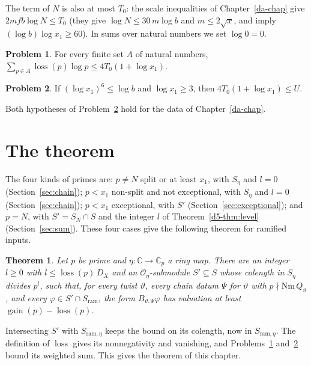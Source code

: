 \documentclass[reqno]{amsart}
\newcounter{chap}
\theoremstyle{definition}
\newtheorem{problem}{Problem}[section]
\theoremstyle{plain}
\newtheorem{theorem}{Theorem}[section]
\theoremstyle{definition}
\theoremstyle{remark}
\newcommand{\C}{{\mathbb{C}}}
\newcommand{\Oc}{\mathcal O}
\newcommand{\gain}{\operatorname{gain}}
\newcommand{\loss}{\operatorname{loss}}
\newcommand{\ram}{\mathrm{ram}}
\newcommand{\Nm}{\mathrm{Nm}\,}
\begin{document}
The term of \(N\) is also at most \(T_0\): the scale inequalities of Chapter~\ref{da-chap} give \(2mfb\log N \le T_0\) (they give \(\log N \le 30\, m\log b\) and \(m \le 2\sqrt{x}\), and imply \((\log b)\log x_1 \ge 60\)).  In sums over natural numbers we set \(\log 0 = 0\).

\begin{problem}\label{pr:harmonic}
For every finite set \(A\) of natural numbers, \(\sum_{p \in A} \loss(p)\log p \le 4T_0(1 + \log x_1)\).
\end{problem}

\begin{problem}\label{pr:final}
If \((\log x_1)^6 \le \log b\) and \(\log x_1 \ge 3\), then \(4T_0(1 + \log x_1) \le U\).
\end{problem}

Both hypotheses of Problem~\ref{pr:final} hold for the data of Chapter~\ref{da-chap}.

\section{The theorem}\label{sec:theorem}

The four kinds of primes are: \(p \ne N\) split or at least \(x_1\), with \(S_\eta\) and \(l = 0\) (Section~\ref{sec:chain}); \(p < x_1\) non-split and not exceptional, with \(S_\eta\) and \(l = 0\) (Section~\ref{sec:chain}); \(p < x_1\) exceptional, with \(S'\) (Section~\ref{sec:exceptional}); and \(p = N\), with \(S' = S_N \cap S\) and the integer \(l\) of Theorem~\ref{d5-thm:level} (Section~\ref{sec:sum}).  These four cases give the following theorem for ramified inputs.

\begin{theorem}\label{thm:one-prime}
Let \(p\) be prime and \(\eta\colon \C \to \C_p\) a ring map.  There are an integer \(l \ge 0\) with \(l \le \loss(p)\, D_X\) and an \(\Oc_\eta\)-submodule \(S' \subseteq S\) whose colength in \(S_\eta\) divides \(p^l\), such that, for every twist \(\vartheta\), every chain datum \(\Psi\) for \(\vartheta\) with \(p \nmid \Nm Q_\vartheta\), and every \(\varphi \in S' \cap S_\ram\), the form \(B_{\vartheta,\Psi}\varphi\) has valuation at least \(\gain(p) - \loss(p)\).
\end{theorem}

Intersecting \(S'\) with \(S_{\ram,\eta}\) keeps the bound on its colength, now in \(S_{\ram,\eta}\).  The definition of \(\loss\) gives its nonnegativity and vanishing, and Problems~\ref{pr:harmonic} and~\ref{pr:final} bound its weighted sum.  This gives the theorem of this chapter.
\end{document}
